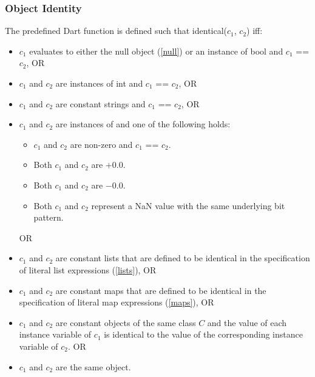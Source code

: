 \documentclass{article}
\newcommand{\code}[1]{{\sf #1}}
\begin{document}
 \subsubsection{Object Identity}

\LMHash{}
The predefined Dart function  is defined such that \code{identical($c_1$, $c_2$)} iff:
 \begin{itemize}
 \item $c_1$  evaluates to either the null object (\ref{null}) or an instance of \code{bool} and \code{$c_1$ == $c_2$}, OR
 \item $c_1$ and $c_2$ are instances of \code{int} and \code{$c_1$ == $c_2$}, OR
 \item $c_1$ and $c_2$ are constant strings and \code{$c_1$ == $c_2$}, OR
 \item $c_1$  and $c_2$  are instances of  and  one of the following holds:
 \begin{itemize}
   \item $c_1$ and $c_2$ are non-zero and \code{$c_1$ == $c_2$}.
   \item  Both $c_1$ and $c_2$ are $+0.0$.
   \item Both  $c_1$ and $c_2$ are $-0.0$.
   \item Both $c_1$ and $c_2$ represent a NaN value with the same underlying bit pattern.
 \end{itemize}
 OR
 \item $c_1$ and $c_2$ are constant lists that are defined to be identical in the specification of literal list expressions (\ref{lists}), OR
 \item $c_1$ and $c_2$ are constant maps that are defined to be identical in the specification of literal map expressions (\ref{maps}), OR
 \item $c_1$ and $c_2$ are constant objects of the same class $C$ and the value of each instance variable of $c_1$ is identical to the value of the corresponding instance variable of $c_2$. OR
 \item $c_1$ and $c_2$ are the same object.
\end{itemize}


\end{document}
